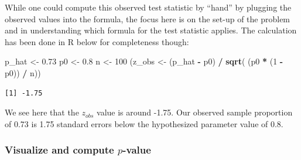 \documentclass[12pt, krantz2,]{krantz}
\makeatletter
\newenvironment{Shaded}{\begin{snugshade}}{\end{snugshade}}
\newcommand{\DataTypeTok}[1]{\textcolor[rgb]{0.27,0.27,0.27}{#1}}
\newcommand{\DecValTok}[1]{\textcolor[rgb]{0.06,0.06,0.06}{#1}}
\newcommand{\FloatTok}[1]{\textcolor[rgb]{0.06,0.06,0.06}{#1}}
\newcommand{\KeywordTok}[1]{\textcolor[rgb]{0.27,0.27,0.27}{\textbf{#1}}}
\newcommand{\NormalTok}[1]{#1}
\newcommand{\OperatorTok}[1]{\textcolor[rgb]{0.43,0.43,0.43}{\textbf{#1}}}
\newcommand{\StringTok}[1]{\textcolor[rgb]{0.5,0.5,0.5}{#1}}
\newenvironment{kframe}{%
\medskip{}
\setlength{\fboxsep}{.8em}
 \def\at@end@of@kframe{}%
 \ifinner\ifhmode%
  \def\at@end@of@kframe{\end{minipage}}%
  \begin{minipage}{\columnwidth}%
 \fi\fi%
 \def\FrameCommand##1{\hskip\@totalleftmargin \hskip-\fboxsep
 \colorbox{shadecolor}{##1}\hskip-\fboxsep
     \hskip-\linewidth \hskip-\@totalleftmargin \hskip\columnwidth}%
 \MakeFramed {\advance\hsize-\width
   \@totalleftmargin\z@ \linewidth\hsize
   \@setminipage}}%
 {\par\unskip\endMakeFramed%
 \at@end@of@kframe}
\renewenvironment{Shaded}{\begin{kframe}}{\end{kframe}}
\makeatother
\begin{document}
While one could compute this observed test statistic by ``hand'' by plugging the observed values into the formula, the focus here is on the set-up of the problem and in understanding which formula for the test statistic applies. The calculation has been done in R below for completeness though:

\begin{Shaded}
\begin{Highlighting}[]
\NormalTok{p_hat <-}\StringTok{ }\FloatTok{0.73}
\NormalTok{p0 <-}\StringTok{ }\FloatTok{0.8}
\NormalTok{n <-}\StringTok{ }\DecValTok{100}
\NormalTok{(z_obs <-}\StringTok{ }\NormalTok{(p_hat }\OperatorTok{-}\StringTok{ }\NormalTok{p0) }\OperatorTok{/}\StringTok{ }\KeywordTok{sqrt}\NormalTok{( (p0 }\OperatorTok{*}\StringTok{ }\NormalTok{(}\DecValTok{1} \OperatorTok{-}\StringTok{ }\NormalTok{p0)) }\OperatorTok{/}\StringTok{ }\NormalTok{n))}
\end{Highlighting}
\end{Shaded}

\begin{verbatim}
[1] -1.75
\end{verbatim}

We see here that the \(z_{obs}\) value is around -1.75. Our observed sample proportion of 0.73 is 1.75 standard errors below the hypothesized parameter value of 0.8.

\hypertarget{visualize-and-compute-p-value}{%
\subsubsection*{\texorpdfstring{Visualize and compute \(p\)-value}{Visualize and compute p-value}}\label{visualize-and-compute-p-value}}


\begin{Shaded}
\end{Shaded}
\end{document}
